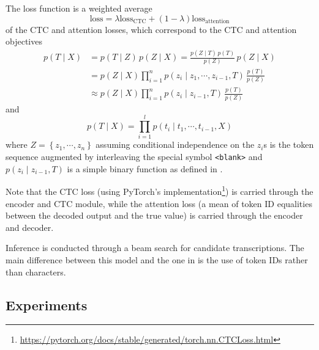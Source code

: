\documentclass{article}
\begin{document}
  The loss function is a weighted average
  $$
    \mathrm{loss} = \lambda \mathrm{loss}_{\mathrm{CTC}} + \left(1 - \lambda\right) \mathrm{loss}_{\mathrm{attention}}
  $$
  of the CTC and attention losses, which correspond to the CTC and attention objectives
  \begin{align*}
    p(T \mid X) &= p(T \mid Z) \, p(Z \mid X)
                 = \frac{p(Z \mid T) \, p(T)}{p(Z)} \, p(Z \mid X) \\
                &= p(Z \mid X) \prod_{i = 1}^n p \left(z_i \mid z_1, \cdots, z_{i - 1}, T\right) \, \frac{p(T)}{p(Z)} \\
                &\approx p(Z \mid X) \prod_{i = 1}^n p \left(z_i \mid z_{i - 1}, T\right) \, \frac{p(T)}{p(Z)}
  \end{align*}
  and
  $$
    p(T \mid X) = \prod_{i = 1}^l p \left(t_i \mid t_1, \cdots, t_{i - 1}, X\right)
  $$
  where $Z = \left\{z_1, \cdots, z_n\right\}$ assuming conditional independence on the $z_i$s is the token sequence augmented by interleaving the special symbol \texttt{<blank>} and $p \left(z_i \mid z_{i - 1}, T\right)$ is a simple binary function as defined in \cite{Kim}.

  Note that the CTC loss (using PyTorch's implementation\footnote{\url{https://pytorch.org/docs/stable/generated/torch.nn.CTCLoss.html}}) is carried through the encoder and CTC module, while the attention loss (a mean of token ID equalities between the decoded output and the true value) is carried through the encoder and decoder.

  Inference is conducted through a beam search for candidate transcriptions. The main difference between this model and the one in \cite{Kim} is the use of token IDs rather than characters.
  \subsection{Experiments} \label{experiments}
\end{document}
